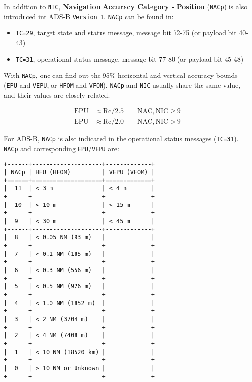 In addition to \texttt{NIC}, \textbf{Navigation Accuracy Category -
Position} (\texttt{NACp}) is also introduced int ADS-B
\texttt{Version\ 1}. \texttt{NACp} can be found in:

\begin{itemize}

\item
  \texttt{TC=29}, target state and status message, message bit 72-75 (or
  payload bit 40-43)
\item
  \texttt{TC=31}, operational status message, message bit 77-80 (or
  payload bit 45-48)
\end{itemize}

With \texttt{NACp}, one can find out the 95\% horizontal and vertical
accuracy bounds (\texttt{EPU} and \texttt{VEPU}, or \texttt{HFOM} and
\texttt{VFOM}). \texttt{NACp} and \texttt{NIC} usually share the same
value, and their values are closely related.

\begin{equation}
  \begin{split}
    \mathrm{EPU} &\approx \mathrm{Rc} / 2.5   \qquad  \mathrm{NAC, NIC} \ge 9 \\
    \mathrm{EPU} &\approx \mathrm{Rc} / 2.0  \qquad  \mathrm{NAC, NIC} > 9
  \end{split}
\end{equation}

For ADS-B, \texttt{NACp} is also indicated in the operational status
messages (\texttt{TC=31}). \texttt{NACp} and corresponding
\texttt{EPU}/\texttt{VEPU} are:

\begin{verbatim}
+------+--------------------+-------------+
| NACp | HFU (HFOM)         | VEPU (VFOM) |
+======+====================+=============+
|  11  | < 3 m              | < 4 m       |
+------+--------------------+-------------+
|  10  | < 10 m             | < 15 m      |
+------+--------------------+-------------+
|  9   | < 30 m             | < 45 m      |
+------+--------------------+-------------+
|  8   | < 0.05 NM (93 m)   |             |
+------+--------------------+-------------+
|  7   | < 0.1 NM (185 m)   |             |
+------+--------------------+-------------+
|  6   | < 0.3 NM (556 m)   |             |
+------+--------------------+-------------+
|  5   | < 0.5 NM (926 m)   |             |
+------+--------------------+-------------+
|  4   | < 1.0 NM (1852 m)  |             |
+------+--------------------+-------------+
|  3   | < 2 NM (3704 m)    |             |
+------+--------------------+-------------+
|  2   | < 4 NM (7408 m)    |             |
+------+--------------------+-------------+
|  1   | < 10 NM (18520 km) |             |
+------+--------------------+-------------+
|  0   | > 10 NM or Unknown |             |
+------+--------------------+-------------+
\end{verbatim}


